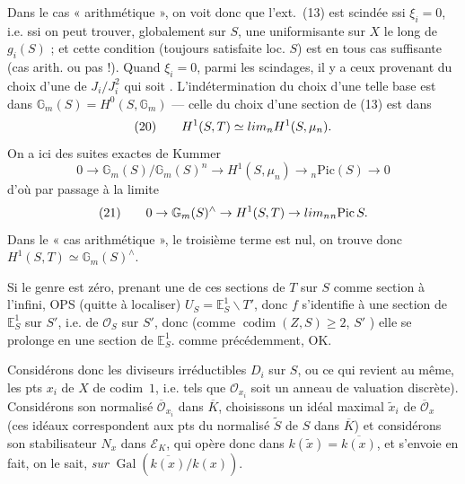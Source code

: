\documentclass[11pt,a4paper]{article}
\begin{document}

Dans le cas « arithmétique », on voit donc que l'ext.~(13) est scindée ssi
$\xi_i = 0$, i.e. ssi on peut trouver, globalement sur $S$, une uniformisante
sur $X$ le long de $g_i(S)$ ; et cette condition (toujours satisfaite
loc.   $S$) est en tous cas suffisante (cas arith. ou
pas !). Quand $\xi_i = 0$, parmi les scindages, il y a ceux provenant du choix
d'une   de $J_i/J_i^2$ qui soit
. L'indétermination du choix d'une telle base est dans
$\mathbb{G}_m(S) = H^0(S, \mathbb{G}_m)$ — celle du choix d'une section de (13)
est dans
\[
  (20)\qquad H^1(S, T) \simeq \varprojlim_n H^1(S, \mu_n) .
\]
On a ici des suites exactes de Kummer
\[
  0 \to \mathbb{G}_m(S)/\mathbb{G}_m(S)^n \to H^1(S, \mu_n) \to {}_n\mathrm{Pic}(S) \to 0
\]
d'où par passage à la limite
\[
  (21)\qquad 0 \to \mathbb{G}_m(S)^{\wedge} \to H^1(S, T) \to \varprojlim_n {}_n\mathrm{Pic}\, S .
\]
Dans le « cas arithmétique », le troisième terme est nul, on trouve donc
 $H^1(S, T) \simeq \mathbb{G}_m(S)^{\wedge}$.


Si le genre est zéro, prenant une de ces sections de $T$ sur $S$ comme section
à l'infini, OPS (quitte à localiser) $U_S = \mathbb{E}^1_S \smallsetminus T'$,
donc $f$ s'identifie à une section de $\mathbb{E}^1_S$ sur $S'$, i.e.
de $\mathcal{O}_S$ sur $S'$, donc (comme $\operatorname{codim}(Z, S) \geq 2$,
$S'$ ) elle se prolonge en une section de $\mathbb{E}^1_S$.
 comme précédemment, OK.

 Considérons donc les diviseurs irréductibles $D_i$ sur $S$,
ou ce qui revient au même, les pts $x_i$ de $X$ de codim~$1$, i.e. tels que
$\mathcal{O}_{x_i}$ soit un anneau de valuation discrète).
Considérons son normalisé $\overline{\mathcal{O}}_{x_i}$ dans $\overline{K}$,
choisissons un idéal maximal $\tilde{x}_i$ de $\overline{\mathcal{O}}_x$
\struck{\ill{}} (ces idéaux correspondent  aux pts du
normalisé $\tilde{S}$ de $S$ dans $\overline{K}$) et considérons son
stabilisateur $N_x$ dans $\mathcal{E}_K$, qui opère donc dans
$k(\tilde{x}) = \overline{k(x)}$, et s'envoie en fait, on le sait, \emph{sur}
$\operatorname{Gal}(\overline{k(x)}/k(x))$.
\end{document}
